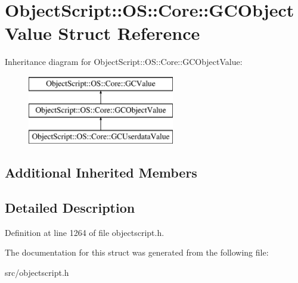 \hypertarget{struct_object_script_1_1_o_s_1_1_core_1_1_g_c_object_value}{}\section{Object\+Script\+:\+:OS\+:\+:Core\+:\+:G\+C\+Object\+Value Struct Reference}
\label{struct_object_script_1_1_o_s_1_1_core_1_1_g_c_object_value}
Inheritance diagram for Object\+Script\+:\+:OS\+:\+:Core\+:\+:G\+C\+Object\+Value\+:\begin{figure}[H]
\begin{center}
\leavevmode
\includegraphics[height=3.000000cm]{struct_object_script_1_1_o_s_1_1_core_1_1_g_c_object_value}
\end{center}
\end{figure}
\subsection*{Additional Inherited Members}


\subsection{Detailed Description}


Definition at line 1264 of file objectscript.\+h.



The documentation for this struct was generated from the following file\+:\begin{DoxyCompactItemize}
\item 
src/objectscript.\+h\end{DoxyCompactItemize}
